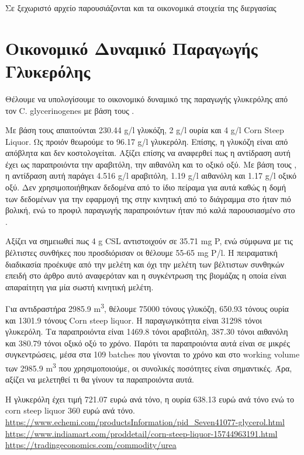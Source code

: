 \documentclass[11pt]{article}
\begin{document}
Σε ξεχωριστό αρχείο παρουσιάζονται και τα οικονομικά στοιχεία της διεργασίας

\section{Οικονομικό Δυναμικό Παραγωγής Γλυκερόλης}
\label{sec:org0d6c6b1}

Θέλουμε να υπολογίσουμε το οικονομικό δυναμικό της παραγωγής γλυκερόλης από τον C. glycerinogenes με βάση τους \cite{jinByproductFormationNovel2003,zhugeGlycerolProductionNovel2001} .

Με βάση τους \cite{jinByproductFormationNovel2003} απαιτούνται 230.44 g/l γλυκόζη, 2 g/l ουρία και 4 g/l Corn Steep Liquor. Ως προιόν θεωρούμε το 96.17 g/l γλυκερόλη. Επίσης, η γλυκόζη είναι από απόβλητα και δεν κοστολογείται. Αξίζει επίσης να αναφερθεί πως η αντίδραση αυτή έχει ως παραπροιόντα την αραβιτόλη, την αιθανόλη και το οξικό οξύ. Με βάση τους \cite{zhugeGlycerolProductionNovel2001}, η αντίδραση αυτή παράγει 4.516 g/l αραβιτόλη, 1.19 g/l αιθανόλη και 1.17 g/l οξικό οξύ. Δεν χρησιμοποιήθηκαν δεδομένα από το ίδιο πείραμα για αυτά καθώς η δομή των δεδομένων για την εφαρμογή της στην κινητική από το διάγραμμα στο \cite{jinByproductFormationNovel2003} ήταν πιό βολική, ενώ το προφιλ παραγωγής παραπροιόντων ήταν πιό καλά παρουσιασμένο στο \cite{zhugeGlycerolProductionNovel2001}.

Αξίζει να σημειωθεί πως 4 g CSL αντιστοιχούν σε 35.71 mg P, ενώ σύμφωνα με τις βέλτιστες συνθήκες που προσδιόρισαν οι \cite{zhugeGlycerolProductionNovel2001} θέλουμε 55-65 mg P/l. Η πειραματική διαδικασία προέκυψε από την μελέτη \cite{jinByproductFormationNovel2003} και όχι την μελέτη των βέλτιστων συνθηκών επειδή στο άρθρο αυτό αναφερόταν και η συγκέντρωση της βιομάζας η οποία είναι απαραίτητη για μία σωστή κινητική μελέτη.

Για αντιδραστήρα 2985.9 m\textsuperscript{3}, θέλουμε 75000 τόνους γλυκόζη, 650.93 τόνους ουρία και 1301.9 τόνους Corn steep liquor. Η παραγωγικότητα είναι 31298 τόνοι γλυκερόλη. Τα παραπροιόντα είναι 1469.8 τόνοι αραβιτόλη, 387.30 τόνοι αιθανόλη και 380.79 τόνοι οξικό οξύ το χρόνο. Παρότι τα παραπροιόντα αυτά είναι σε μικρές συγκεντρώσεις, μέσα στα 109 batches που γίνονται το χρόνο και στο working volume των 2985.9 m\textsuperscript{3} που χρησιμοποιούμε, οι συνολικές ποσότητες είναι σημαντικές. Άρα, αξίζει να μελετηθεί τι θα γίνουν τα παραπροιόντα αυτά.

Η γλυκερόλη έχει τιμή 721.07 ευρώ ανά τόνο, η ουρία 638.13 ευρώ ανά τόνο ενώ το corn steep liquor 360 ευρώ ανά τόνο. \url{https://www.echemi.com/productsInformation/pid\_Seven41077-glycerol.html}
\url{https://www.indiamart.com/proddetail/corn-steep-liquor-15744963191.html}
\url{https://tradingeconomics.com/commodity/urea}
\end{document}
